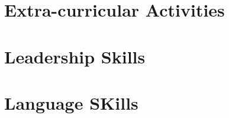 \documentclass[
]{book}
\begin{document}
\hypertarget{extra-curricular-activities}{%
\chapter*{Extra-curricular Activities}\label{extra-curricular-activities}}

\hypertarget{leadership-skills}{%
\chapter*{Leadership Skills}\label{leadership-skills}}

\hypertarget{language-skills}{%
\chapter*{Language SKills}\label{language-skills}}

  
\end{document}
